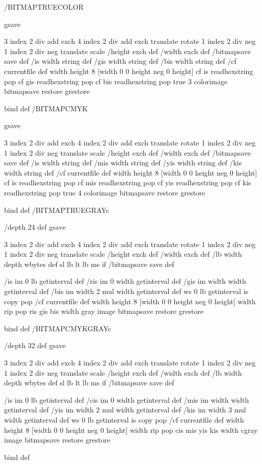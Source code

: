 /BITMAPTRUECOLOR { 
        gsave
		
		3 index 2 div add exch	
		4 index 2 div add exch	
		translate		
		rotate			
		1 index 2 div neg	
		1 index 2 div neg	
		translate		
		scale			
		/height exch def /width exch def
        /bitmapsave save def 
        /is width string def
        /gis width string def
        /bis width string def
        /cf currentfile def 
        width height 8 [width 0 0 height neg 0 height] 
        { cf is readhexstring pop } 
        { cf gis readhexstring pop } 
        { cf bis readhexstring pop } 
        true 3 colorimage 
        bitmapsave restore 
        grestore
        } bind def
/BITMAPCMYK { 
        gsave
		
		3 index 2 div add exch	
		4 index 2 div add exch	
		translate		
		rotate			
		1 index 2 div neg	
		1 index 2 div neg	
		translate		
		scale			
		/height exch def /width exch def
        /bitmapsave save def 
        /is width string def
        /mis width string def
        /yis width string def
        /kis width string def
        /cf currentfile def 
        width height 8 [width 0 0 height neg 0 height] 
        { cf is readhexstring pop } 
        { cf mis readhexstring pop } 
        { cf yis readhexstring pop } 
        { cf kis readhexstring pop } 
        true 4 colorimage 
        bitmapsave restore 
        grestore
        } bind def
/BITMAPTRUEGRAYc { 
	/depth 24 def
        gsave
	
	3 index 2 div add exch	
	4 index 2 div add exch	
	translate		
	rotate			
	1 index 2 div neg	
	1 index 2 div neg	
	translate		
	scale			
	/height exch def /width exch def
	/lb width depth wbytes def 
	sl lb lt {lb ms} if 
        /bitmapsave save def 
        
	/is im 0 lb getinterval def	
	/ris im 0 width getinterval def	
	/gis im width width getinterval def	
	/bis im width 2 mul width getinterval def 
        ws 0 lb getinterval is copy pop 
        /cf currentfile def 
        width height 8 [width 0 0 height neg 0 height] 
        {width rip pop ris gis bis width gray} image
        bitmapsave restore 
        grestore
        } bind def
/BITMAPCMYKGRAYc { 
	/depth 32 def
        gsave
	
	3 index 2 div add exch	
	4 index 2 div add exch	
	translate		
	rotate			
	1 index 2 div neg	
	1 index 2 div neg	
	translate		
	scale			
	/height exch def /width exch def
	/lb width depth wbytes def 
	sl lb lt {lb ms} if 
        /bitmapsave save def 
        
	/is im 0 lb getinterval def	
	/cis im 0 width getinterval def	
	/mis im width width getinterval def	
	/yis im width 2 mul width getinterval def 
	/kis im width 3 mul width getinterval def 
        ws 0 lb getinterval is copy pop 
        /cf currentfile def 
        width height 8 [width 0 0 height neg 0 height] 
        {width rip pop cis mis yis kis width cgray} image
        bitmapsave restore 
        grestore
        } bind def
